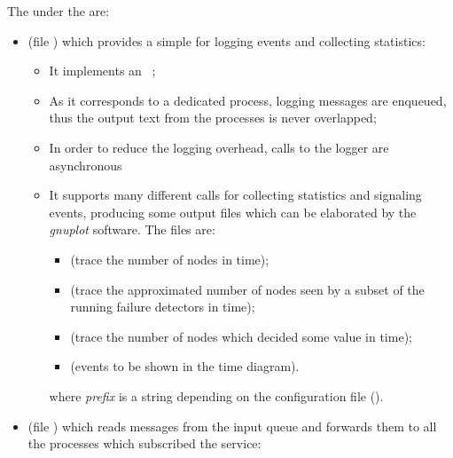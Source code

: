 The  under the  
are:
\begin{itemize}

\item   {} (file )
        which provides a simple  for logging events and
        collecting statistics:

    \begin{itemize}

    \item   It implements an \OTP\ ;

    \item   As it corresponds to a dedicated process, logging messages are
            enqueued, thus the output text from the processes is never
            overlapped;

    \item   In order to reduce the logging overhead, calls to the logger
            are asynchronous

    \item   It supports many different calls for collecting statistics and
            signaling events, producing some output files which can be
            elaborated by the \emph{gnuplot} software. The files are:
        \begin{itemize}
        \item   {} (trace
                the number of nodes in time);
        \item   {}
                (trace the approximated number of nodes seen by a subset
                of the running failure detectors in time);
        \item   {}
                (trace the number of nodes which decided some value in
                time);
        \item   {} (events to
                be shown in the time diagram).
        \end{itemize}
            where \emph{prefix} is a string depending on
            the configuration file ().

    \end{itemize}

\item   {} (file ) which
        reads messages from the input queue and forwards them to all the
        processes which subscribed the service:
    \begin{itemize}


\end{itemize}
\end{itemize}
